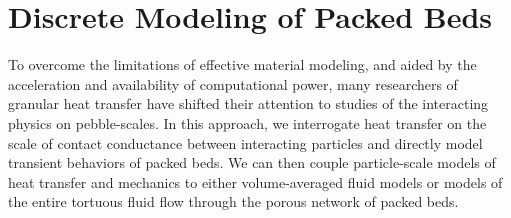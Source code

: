 \documentclass[11pt]{report} %
\begin{document}
\section{Discrete Modeling of Packed Beds}
To overcome the limitations of effective material modeling, and aided by the acceleration and availability of computational power, many researchers of granular heat transfer have shifted their attention to studies of the interacting physics on pebble-scales. In this approach, we interrogate heat transfer on the scale of contact conductance between interacting particles and directly model transient behaviors of packed beds. We can then couple particle-scale models of heat transfer and mechanics to either volume-averaged fluid models or models of the entire tortuous fluid flow through the porous network of packed beds.








\end{document}
